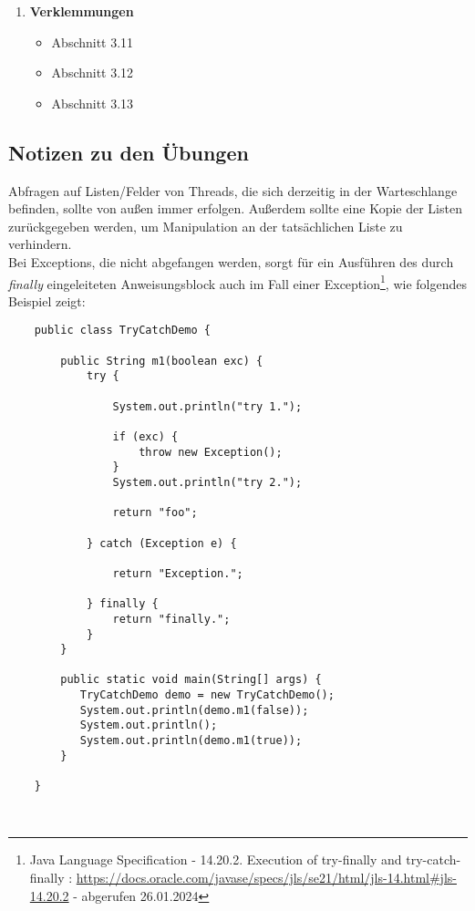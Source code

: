 \begin{tcolorbox}[colback=white!20,color=white]
\begin{enumerate}
        \item \textbf{Verklemmungen}
        \begin{itemize}
            \item[] Abschnitt 3.11
            \item[] Abschnitt 3.12
            \item[] Abschnitt 3.13
        \end{itemize}

    \end{enumerate}
\end{tcolorbox}

\newpage






\subsection{Notizen zu den Übungen}

Abfragen auf Listen/Felder von Threads, die sich derzeitig in der Warteschlange befinden, sollte von außen immer  erfolgen.
Außerdem sollte eine Kopie der Listen zurückgegeben werden, um Manipulation an der tatsächlichen Liste zu verhindern.\\

\noindent
Bei Exceptions, die nicht abgefangen werden, sorgt  für ein Ausführen des durch \textit{finally} eingeleiteten Anweisungsblock auch im Fall einer Exception\footnote{
    Java Language Specification - 14.20.2. Execution of try-finally and try-catch-finally : \url{https://docs.oracle.com/javase/specs/jls/se21/html/jls-14.html#jls-14.20.2} - abgerufen 26.01.2024
}, wie folgendes Beispiel zeigt:

\begin{verbatim}
    public class TryCatchDemo {

        public String m1(boolean exc) {
            try {

                System.out.println("try 1.");

                if (exc) {
                    throw new Exception();
                }
                System.out.println("try 2.");

                return "foo";

            } catch (Exception e) {

                return "Exception.";

            } finally {
                return "finally.";
            }
        }

        public static void main(String[] args) {
           TryCatchDemo demo = new TryCatchDemo();
           System.out.println(demo.m1(false));
           System.out.println();
           System.out.println(demo.m1(true));
        }

    }
\end{verbatim}\\

